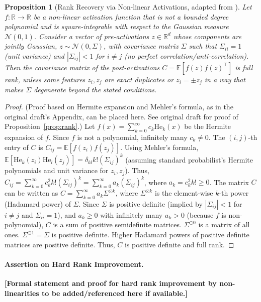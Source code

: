 \documentclass{article}
\newcommand{\R}{\mathbb{R}}
\newcommand{\E}{\mathbb{E}}
\newcommand{\He}{\mathrm{He}} %
\newtheorem{proposition}{Proposition}[section]
\begin{document}
\begin{proposition}[Rank Recovery via Non-linear Activations, adapted from \citet{draft_placeholder_prop_rank}]
\label{prop:rank_recovery_nonlinear}
Let $f:\R\to\R$ be a non-linear activation function that is not a bounded degree polynomial and is square-integrable with respect to the Gaussian measure $\mathcal{N}(0,1)$. Consider a vector of pre-activations $z\in\R^d$ whose components are jointly Gaussian, $z \sim \mathcal{N}(0, \Sigma)$, with covariance matrix $\Sigma$ such that $\Sigma_{ii}=1$ (unit variance) and $|\Sigma_{ij}|<1$ for $i \neq j$ (no perfect correlation/anti-correlation). Then the covariance matrix of the post-activations $C = \E[f(z)f(z)^\top]$ is full rank, unless some features $z_i, z_j$ are exact duplicates or $z_i = \pm z_j$ in a way that makes $\Sigma$ degenerate beyond the stated conditions.
\end{proposition}
\begin{proof}
(Proof based on Hermite expansion and Mehler's formula, as in the original draft's Appendix, can be placed here. See original draft for proof of Proposition~\ref{prop:rank}.)
Let $f(x) = \sum_{k=0}^{\infty} c_k \He_k(x)$ be the Hermite expansion of $f$. Since $f$ is not a polynomial, infinitely many $c_k \neq 0$.
The $(i, j)$-th entry of $C$ is $C_{ij} = \E[f(z_i) f(z_j)]$.
Using Mehler's formula, $\E[\He_k(z_i) \He_l(z_j)] = \delta_{kl} k! (\Sigma_{ij})^k$ (assuming standard probabilist's Hermite polynomials and unit variance for $z_i, z_j$).
Thus, $C_{ij} = \sum_{k=0}^{\infty} c_k^2 k! (\Sigma_{ij})^k = \sum_{k=0}^{\infty} a_k (\Sigma_{ij})^k$, where $a_k = c_k^2 k! \ge 0$.
The matrix $C$ can be written as $C = \sum_{k=0}^{\infty} a_k \Sigma^{\odot k}$, where $\Sigma^{\odot k}$ is the element-wise $k$-th power (Hadamard power) of $\Sigma$.
Since $\Sigma$ is positive definite (implied by $|\Sigma_{ij}|<1$ for $i \neq j$ and $\Sigma_{ii}=1$), and $a_k \ge 0$ with infinitely many $a_k > 0$ (because $f$ is non-polynomial), $C$ is a sum of positive semidefinite matrices. $\Sigma^{\odot 0}$ is a matrix of all ones. $\Sigma^{\odot 1} = \Sigma$ is positive definite. Higher Hadamard powers of positive definite matrices are positive definite.
Thus, $C$ is positive definite and full rank.
\end{proof}

\paragraph{Assertion on Hard Rank Improvement.}
\textbf{[Formal statement and proof for hard rank improvement by non-linearities to be added/referenced here if available.]}
\end{document}
